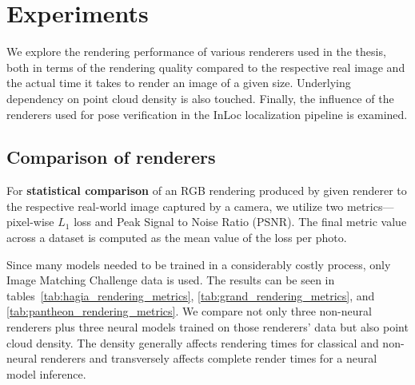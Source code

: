 \section{Experiments} %

We explore the rendering performance of various renderers used in the thesis,
both in terms of the rendering quality compared to the respective real image
and the actual time it takes to render an image of a given size. Underlying
dependency on point cloud density is also touched. Finally, the influence of the
renderers used for pose verification in the InLoc localization pipeline is examined.


\subsection{Comparison of renderers}

For \textbf{statistical comparison} of an RGB rendering produced by
given renderer to the
respective real-world image captured by a camera, we utilize two
metrics---pixel-wise $L_1$ loss and Peak Signal to Noise Ratio (PSNR). The final metric
value across a dataset is computed as the mean value of the loss per photo.

Since many models needed to be trained in a considerably costly
process, only Image Matching Challenge data is used. The results can be seen in
tables~\cref{tab:hagia_rendering_metrics}, \cref{tab:grand_rendering_metrics},
and \cref{tab:pantheon_rendering_metrics}. We compare not only three non-neural
renderers plus three neural models trained on those renderers' data but
also point cloud density. The density generally affects rendering times for
classical and non-neural renderers and transversely affects complete render
times for a neural model inference.

